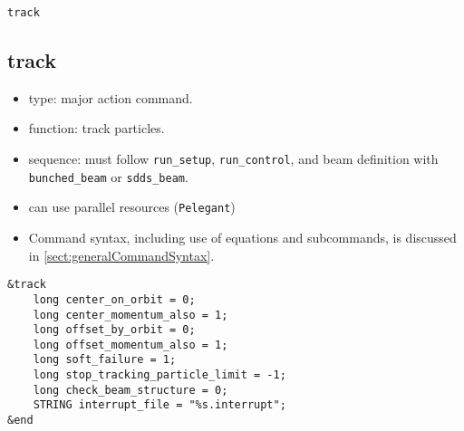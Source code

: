 \documentclass[11pt]{article}
\begin{document}
\newpage
\begin{center}{\Large\verb|track|}\end{center}
\subsection{track \label{subsec:track}}

\begin{itemize}
\item type: major action command.
\item function: track particles.
\item sequence: must follow \verb|run_setup|, \verb|run_control|, and beam definition with \verb|bunched_beam| or \verb|sdds_beam|.
\item can use parallel resources (\verb|Pelegant|)
\item Command syntax, including use of equations and subcommands, is discussed in \ref{sect:generalCommandSyntax}.
\end{itemize}

\begin{verbatim}
&track
    long center_on_orbit = 0;
    long center_momentum_also = 1;
    long offset_by_orbit = 0;
    long offset_momentum_also = 1;
    long soft_failure = 1;
    long stop_tracking_particle_limit = -1;
    long check_beam_structure = 0;
    STRING interrupt_file = "%s.interrupt";
&end
\end{verbatim}
\end{document}
